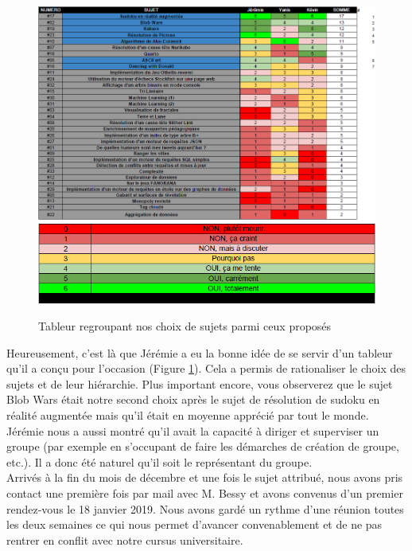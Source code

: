\documentclass[11pt,a4paper]{article}
\begin{document}
\begin{figure}[htbp]
\begin{center}
\includegraphics[scale=0.47]{figures/tableur_choix}
\includegraphics[scale=0.5]{figures/legende_tableur.png}
\caption{Tableur regroupant nos choix de sujets parmi ceux proposés}
\label{fig:Screenshot2}
\end{center}
\end{figure}

Heureusement, c'est là que Jérémie a eu la bonne idée de se servir d'un tableur qu'il a conçu pour l'occasion (Figure \ref{fig:Screenshot2}). Cela a permis de rationaliser le choix des sujets et de leur hiérarchie. Plus important encore, vous observerez que le sujet Blob Wars était notre second choix après le sujet de résolution de sudoku en réalité augmentée mais qu'il était en moyenne apprécié par tout le monde. Jérémie nous a aussi montré qu'il avait la capacité à diriger et superviser un groupe (par exemple en s'occupant de faire les démarches de création de groupe, etc.). Il a donc été naturel qu'il soit le représentant du groupe.\\

Arrivés à la fin du mois de décembre et une fois le sujet attribué, nous avons pris contact une première fois par mail avec M. Bessy et avons convenus d'un premier rendez-vous le 18 janvier 2019. Nous avons gardé un rythme d'une réunion toutes les deux semaines ce qui nous permet d'avancer convenablement et de ne pas rentrer en conflit avec notre cursus universitaire.
\end{document}
